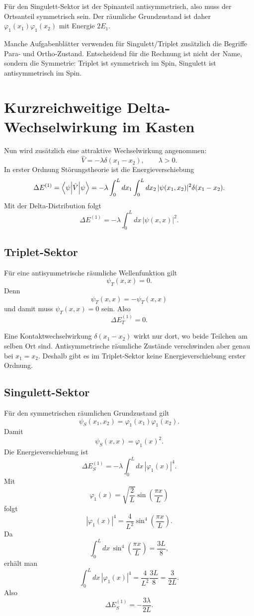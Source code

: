 \begin{answerbox}
Für den Singulett-Sektor ist der Spinanteil antisymmetrisch, also muss der Ortsanteil symmetrisch sein. Der räumliche Grundzustand ist daher \(\varphi_1(x_1)\varphi_1(x_2)\) mit Energie \(2E_1\).
\end{answerbox}

\begin{notebox}
Manche Aufgabenblätter verwenden für Singulett/Triplet zusätzlich die Begriffe Para- und Ortho-Zustand. Entscheidend für die Rechnung ist nicht der Name, sondern die Symmetrie: Triplet ist symmetrisch im Spin, Singulett ist antisymmetrisch im Spin.
\end{notebox}

\section{Kurzreichweitige Delta-Wechselwirkung im Kasten}

Nun wird zusätzlich eine attraktive Wechselwirkung angenommen:
\[
    \hat V = -\lambda\delta(x_1-x_2),
    \qquad \lambda>0.
\]
In erster Ordnung Störungstheorie ist die Energieverschiebung
\[
    \Delta E^{(1)}
    =\left\langle\psi\middle|\hat V\middle|\psi\right\rangle
    =-\lambda\int_0^L dx_1\int_0^L dx_2\,
    |\psi(x_1,x_2)|^2\delta(x_1-x_2).
\]
Mit der Delta-Distribution folgt
\[
    \Delta E^{(1)}
    =-\lambda\int_0^L dx\,|\psi(x,x)|^2.
\]

\subsection{Triplet-Sektor}

Für eine antisymmetrische räumliche Wellenfunktion gilt
\[
    \psi_T(x,x)=0.
\]
Denn
\[
    \psi_T(x,x)=-\psi_T(x,x)
\]
und damit muss \(\psi_T(x,x)=0\) sein. Also
\[
    \Delta E_T^{(1)}=0.
\]

\begin{conceptbox}
Eine Kontaktwechselwirkung \(\delta(x_1-x_2)\) wirkt nur dort, wo beide Teilchen am selben Ort sind. Antisymmetrische räumliche Zustände verschwinden aber genau bei \(x_1=x_2\). Deshalb gibt es im Triplet-Sektor keine Energieverschiebung erster Ordnung.
\end{conceptbox}

\subsection{Singulett-Sektor}

Für den symmetrischen räumlichen Grundzustand gilt
\[
    \psi_S(x_1,x_2)=\varphi_1(x_1)\varphi_1(x_2).
\]
Damit
\[
    \psi_S(x,x)=\varphi_1(x)^2.
\]
Die Energieverschiebung ist
\[
    \Delta E_S^{(1)}
    =-\lambda\int_0^L dx\,|\varphi_1(x)|^4.
\]
Mit
\[
    \varphi_1(x)=\sqrt{\frac{2}{L}}\sin\left(\frac{\pi x}{L}\right)
\]
folgt
\[
    |\varphi_1(x)|^4
    =\frac{4}{L^2}\sin^4\left(\frac{\pi x}{L}\right).
\]
Da
\[
    \int_0^L dx\,\sin^4\left(\frac{\pi x}{L}\right)=\frac{3L}{8},
\]
erhält man
\[
    \int_0^L dx\,|\varphi_1(x)|^4
    =\frac{4}{L^2}\frac{3L}{8}
    =\frac{3}{2L}.
\]
Also
\[
    \Delta E_S^{(1)}=-\frac{3\lambda}{2L}.
\]

